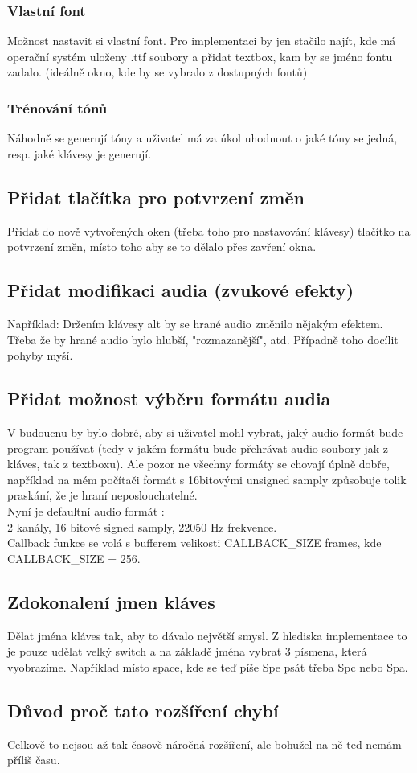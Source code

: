 \documentclass[12pt]{article}
\begin{document}
		\subsubsection{Vlastní font}
	Možnost nastavit si vlastní font. Pro implementaci by jen stačilo najít, kde má operační systém uloženy .ttf soubory a přidat textbox, kam by se jméno fontu zadalo. (ideálně okno, kde by se vybralo z dostupných fontů)
	\subsubsection{Trénování tónů}
	Náhodně se generují tóny a uživatel má za úkol uhodnout o jaké tóny se jedná, resp. jaké klávesy je generují.
	\subsection{Přidat tlačítka pro potvrzení změn}
	Přidat do nově vytvořených oken (třeba toho pro nastavování klávesy) tlačítko na potvrzení změn, místo toho aby se to dělalo přes zavření okna.
	\subsection{Přidat modifikaci audia (zvukové efekty)}
	Například: Držením klávesy alt by se hrané audio změnilo nějakým efektem. Třeba že by hrané audio bylo hlubší, "rozmazanější", atd. Případně toho docílit pohyby myší.
	\subsection{Přidat možnost výběru formátu audia}
	V budoucnu by bylo dobré, aby si uživatel mohl vybrat, jaký audio formát bude program používat (tedy v jakém formátu bude přehrávat audio soubory jak z kláves, tak z textboxu). Ale pozor ne všechny formáty se chovají úplně dobře, například na mém počítači formát s 16bitovými unsigned samply způsobuje tolik praskání, že je hraní neposlouchatelné.
	\\
	Nyní je defaultní audio formát : 
	\\
	2 kanály, 16 bitové signed samply, 22050 Hz frekvence.
	\\
	Callback funkce se volá s bufferem velikosti CALLBACK\_SIZE frames, kde CALLBACK\_SIZE = 256.
	
	\newpage
	\subsection{Zdokonalení jmen kláves}
	Dělat jména kláves tak, aby to dávalo největší smysl. Z hlediska implementace to je pouze udělat velký switch a na základě jména vybrat 3 písmena, která vyobrazíme. Například místo space, kde se teď píše Spe psát třeba Spc nebo Spa.
	\subsection{Důvod proč tato rozšíření chybí}
	Celkově to nejsou až tak časově náročná rozšíření, ale bohužel na ně teď nemám příliš času.
\end{document}
